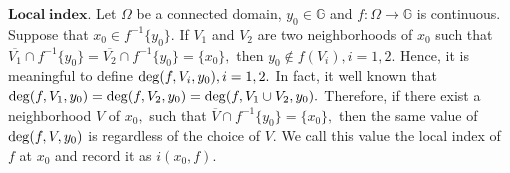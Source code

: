 \documentclass[11pt,twoside]{article}
\theoremstyle{definition}
\theoremstyle{remark}
\begin{document}
$\mathbf{Local\;index}.$ Let $\Omega$ be a connected domain, $y_{0}\in\mathbb{G}$ and   $f:\Omega\rightarrow\mathbb{G}$ is continuous. Suppose that $x_{0}\in f^{-1}\{y_{0}\}.$ If $V_{1}$ and $V_{2}$ are two neighborhoods of $x_{0}$ such that $\overline{V_{1}}\cap f^{-1}\{y_{0}\}=\overline{V_{2}}\cap f^{-1}\{y_{0}\}=\{x_{0}\},$ then $y_{0}\notin f(V_{i}), i=1,2.$ Hence, it is meaningful to define  ${\rm deg}(f,V_{i},y_{0}),i=1,2.$ In fact, it well known that ${\rm deg}(f,V_{1},y_{0})={\rm deg}(f,V_{2},y_{0})={\rm deg}(f,V_{1}\cup V_{2},y_{0}).$ Therefore, if there exist a neighborhood $V$ of $x_{0},$ such that 
$\overline{V}\cap f^{-1}\{y_{0}\}=\{x_{0}\},$ then the same value of ${\rm deg}(f,V,y_{0})$ is regardless of the choice of $V.$ We call this value the local index of $f$ at $x_{0}$ and  record it as $i(x_{0},f).$
\end{document}
